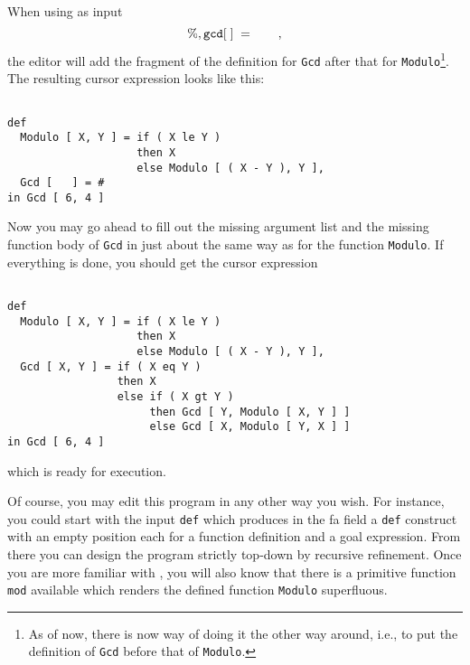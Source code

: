 When using as input
$$
 {\tt \%, gcd [\;]\; =\;\;\;  }\;\;\;\;\;,
$$
the editor will add the fragment
of the definition for {\tt Gcd} after that for {\tt Modulo}\footnote{As of
now, there is now way of doing it the other way around, i.e., to put the definition
of {\tt Gcd} before that of {\tt Modulo}.}.  The resulting
cursor expression looks like this:
\begin{verbatim}

def 
  Modulo [ X, Y ] = if ( X le Y )
                    then X
                    else Modulo [ ( X - Y ), Y ],
  Gcd [   ] = #
in Gcd [ 6, 4 ]

\end{verbatim}
Now you may go ahead to fill out the missing argument list and the
missing function body of {\tt Gcd} in just about the same way as 
for the function {\tt Modulo}. If everything is done, you should
get the cursor expression
\begin{verbatim}

def 
  Modulo [ X, Y ] = if ( X le Y )
                    then X
                    else Modulo [ ( X - Y ), Y ],
  Gcd [ X, Y ] = if ( X eq Y )
                 then X
                 else if ( X gt Y )
                      then Gcd [ Y, Modulo [ X, Y ] ]
                      else Gcd [ X, Modulo [ Y, X ] ]
in Gcd [ 6, 4 ]

\end{verbatim}
which is ready for execution.

Of course, you may edit this program in any other way you wish. For instance,
you could start with the input {\tt def} which produces in the {\sc fa} field
a {\tt def} construct with an empty position each for a function definition
and a goal expression. From there you can design the program strictly
top-down by {\mys recursive refinement}. Once you are more familiar with \kir,
you will also know that there is a primitive function {\tt mod} available
which renders the defined function {\tt Modulo} superfluous.

